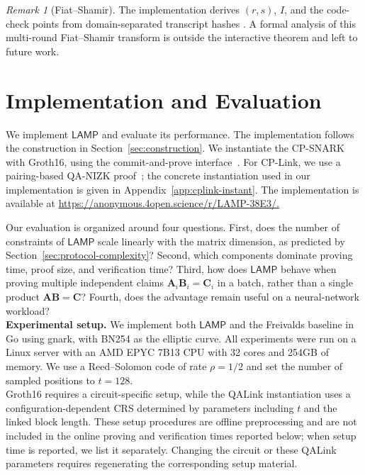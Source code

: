 \documentclass[conference,compsoc]{IEEEtran}
\newcommand{\mat}{\mathbf}          %
\newcommand{\protocol}{\textsf{LAMP}}   %
\theoremstyle{plain}
\theoremstyle{definition}
\theoremstyle{remark}
\newtheorem{remark}{Remark}
\providecommand{\DIFaddtex}[1]{{\protect\color{DIFADD} \sf #1}} %
\providecommand{\DIFaddbegin}{} %
\providecommand{\DIFaddend}{} %
\providecommand{\DIFadd}[1]{\texorpdfstring{\DIFaddtex{#1}}{#1}} %
\providecommand{\DIFaddincludegraphics}[2][]{{\color{blue}\fbox{\DIFOincludegraphics[#1]{#2}}}} %
\DeclareRobustCommand{\DIFaddbegin}{\DIFOaddbegin \let\includegraphics\DIFaddincludegraphics} %
\DeclareRobustCommand{\DIFaddend}{\DIFOaddend \let\includegraphics\DIFOincludegraphics} %
\begin{document}
\begin{remark}[Fiat--Shamir]
The  \DIFaddbegin \DIFadd{implementation derives \((r,s)\)}\DIFaddend , \(I\), and the code-check points from
domain-separated transcript hashes \DIFaddbegin \DIFadd{.  A formal analysis of this multi-round
}\DIFaddend Fiat--Shamir transform  \DIFaddbegin \DIFadd{is outside the interactive theorem and left to future
work}\DIFaddend .
\end{remark}


\section{Implementation and Evaluation}
\label{sec:implementation}

We implement \(\protocol\) and evaluate its performance. The implementation follows the construction in Section~\ref{sec:construction}.  We instantiate the CP-SNARK with Groth16, using the commit-and-prove
interface~\cite{gnark,legosnark}.  For CP-Link, we use a pairing-based QA-NIZK
proof~\cite{qa-nizk}; the concrete instantiation used in our implementation is
given in Appendix~\ref{app:cplink-instant}.  The implementation is available at
\url{https://anonymous.4open.science/r/LAMP-38E3/.}

Our evaluation is organized around four questions.  First, does the number of constraints of \(\protocol\) scale linearly with the matrix dimension, as predicted by Section~\ref{sec:protocol-complexity}?  Second, which components dominate proving time, proof size, and verification time?  Third, how does \(\protocol\) behave when proving multiple independent claims \(\mat{A}_i\mat{B}_i=\mat{C}_i\) in a batch, rather than a single product \(\mat{A}\mat{B}=\mat{C}\)?  Fourth, does the advantage remain useful on a neural-network workload? \\

\noindent\textbf{Experimental setup.}
We implement both \(\protocol\) and the Freivalds baseline in Go using gnark, with BN254 as the elliptic curve.  All experiments were run on a Linux server with an AMD EPYC 7B13 CPU with 32 cores and 254GB of memory.  We use a Reed--Solomon code of rate \(\rho=1/2\) and set the number of sampled positions to \(t=128\). \DIFaddbegin \\
\DIFaddend 

\DIFaddbegin \DIFadd{Groth16 requires a circuit-specific setup, while the QALink instantiation uses
a configuration-dependent CRS determined by parameters including \(t\) and the
linked block length. These setup procedures are offline preprocessing and are
not included in the online proving and verification times reported below; when
setup time is reported, we list it separately. Changing the circuit or these
QALink parameters requires regenerating the corresponding setup material.}\\
\end{document}
